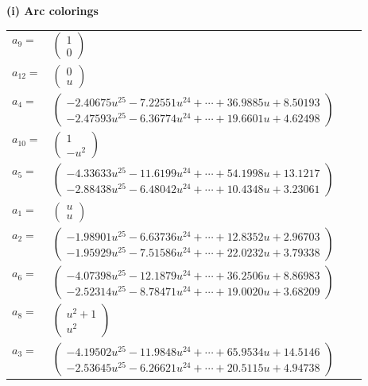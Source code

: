 \documentclass[1p]{elsarticle_modified}
\theoremstyle{definition}
\begin{document}
\flushleft \textbf{(i) Arc colorings}\\
\begin{tabular}{m{7pt} m{180pt} m{7pt} m{180pt} }
\flushright $a_{9}=$&$\begin{pmatrix}1\\0\end{pmatrix}$ \\
\flushright $a_{12}=$&$\begin{pmatrix}0\\u\end{pmatrix}$ \\
\flushright $a_{4}=$&$\begin{pmatrix}-2.40675 u^{25}-7.22551 u^{24}+\cdots+36.9885 u+8.50193\\-2.47593 u^{25}-6.36774 u^{24}+\cdots+19.6601 u+4.62498\end{pmatrix}$ \\
\flushright $a_{10}=$&$\begin{pmatrix}1\\- u^2\end{pmatrix}$ \\
\flushright $a_{5}=$&$\begin{pmatrix}-4.33633 u^{25}-11.6199 u^{24}+\cdots+54.1998 u+13.1217\\-2.88438 u^{25}-6.48042 u^{24}+\cdots+10.4348 u+3.23061\end{pmatrix}$ \\
\flushright $a_{1}=$&$\begin{pmatrix}u\\u\end{pmatrix}$ \\
\flushright $a_{2}=$&$\begin{pmatrix}-1.98901 u^{25}-6.63736 u^{24}+\cdots+12.8352 u+2.96703\\-1.95929 u^{25}-7.51586 u^{24}+\cdots+22.0232 u+3.79338\end{pmatrix}$ \\
\flushright $a_{6}=$&$\begin{pmatrix}-4.07398 u^{25}-12.1879 u^{24}+\cdots+36.2506 u+8.86983\\-2.52314 u^{25}-8.78471 u^{24}+\cdots+19.0020 u+3.68209\end{pmatrix}$ \\
\flushright $a_{8}=$&$\begin{pmatrix}u^2+1\\u^2\end{pmatrix}$ \\
\flushright $a_{3}=$&$\begin{pmatrix}-4.19502 u^{25}-11.9848 u^{24}+\cdots+65.9534 u+14.5146\\-2.53645 u^{25}-6.26621 u^{24}+\cdots+20.5115 u+4.94738\end{pmatrix}$ \\

\end{tabular}
\end{document}
